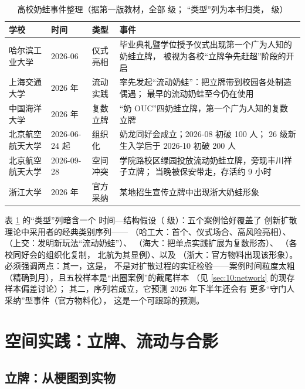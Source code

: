 \begin{table}[htbp]\centering
  \caption{高校奶蛙事件整理（据第一版教材，全部  级；
          “类型”列为本书归类， 级）}
  \label{tab:10:cases}
  \small
  \begin{tabularx}{\textwidth}{@{}lllX@{}}
    \toprule
    学校 & 时间 & 类型 & 事件 \\ \midrule
    哈尔滨工业大学 & 2026-06 & 仪式亮相 &
      毕业典礼暨学位授予仪式出现第一个广为人知的奶蛙立牌，
      被视为各校“立牌争先赶超”阶段的开启 \\
    上海交通大学 & 2026 年 & 流动实践 &
      率先发起“流动奶蛙”：把立牌带到校园各处制造偶遇；
      最早的流动奶蛙至今仍在使用 \\
    中国海洋大学 & 2026 年 & 复数立牌 &
      “奶 OUC”四奶蛙立牌，第一个广为人知的复数立牌 \\
    北京航空航天大学 & 2026-06-24 起 & 组织化 &
      奶龙同好会成立；2026-08 初破 100 人；
      26 级新生入学后于 2026-10 初破 200 人 \\
    北京航空航天大学 & 2026-09-28 & 空间冲突 &
      学院路校区绿园投放流动奶蛙立牌，旁现丰川祥子立牌；
      当晚被保安带走，存活约 9 小时 \\
    浙江大学 & 2026 年 & 官方采纳 &
      某地招生宣传立牌中出现浙大奶蛙形象 \\
    \bottomrule
  \end{tabularx}
\end{table}

表 \ref{tab:10:cases} 的“类型”列暗含一个
时间—结构假设（ 级）：五个案例恰好覆盖了
创新扩散理论中采用者的经典类别序列——
（哈工大：首个、仪式场合、高风险亮相）、
（上交：发明新玩法“流动奶蛙”）、
（海大：把单点实践扩展为复数形态）、
（各校同好会的组织化复制，
北航为其显例）、以及
（浙大：官方物料出现该形象）\cite{rogers2003diffusion}。
必须强调两点：其一，这是，
不是对扩散过程的实证检验——案例时间粒度太粗
（精确到月），且五校样本是“出圈案例”的截尾样本
（见 \ref{sec:10:network} 的现存样本偏差讨论）；
其二，序列若成立，它预测 2026 年下半年还会有
更多“守门人采纳”型事件（官方物料化），
这是一个可跟踪的预测。

\section{空间实践：立牌、流动与合影}\label{sec:10:space}

\subsection{立牌：从梗图到实物}

